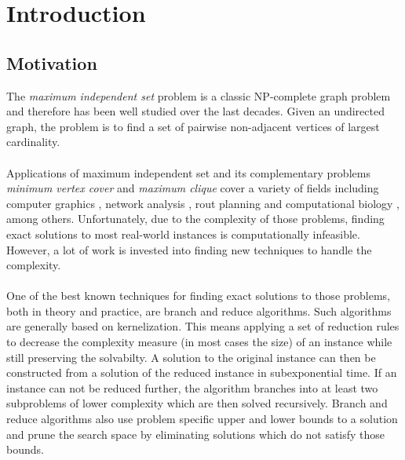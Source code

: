 \documentclass[]{article}
\title{}
\author{}
\begin{document}



\section{Introduction} \label{sec1}
\subsection{Motivation}
The \emph{maximum independent set} problem is a classic NP-complete graph problem \cite{GareyJohnson} and therefore has been well studied over the last decades. Given an undirected graph, the problem is to find a set of pairwise non-adjacent vertices of largest cardinality.\paragraph{}
Applications of maximum independent set and its complementary problems \emph{minimum vertex cover} and \emph{maximum clique} cover a variety of fields including computer graphics \cite{CG}, network analysis \cite{NW}, rout planning \cite{RP} and computational biology \cite{BIO1, BIO2}, among others. Unfortunately, due to the complexity of those problems, finding exact solutions to most real-world instances is computationally infeasible. However, a lot of work is invested into finding new techniques to handle the complexity. \paragraph{}
One of the best known techniques for finding exact solutions to those problems, both  in theory and practice, are branch and reduce algorithms. Such algorithms are generally based on kernelization. This means applying a set of reduction rules to decrease the complexity measure (in most cases the size) of an instance while still preserving the solvabilty. A solution to the original instance can then be constructed from a solution of the reduced instance in subexponential time. If an instance can not be reduced further, the algorithm branches into at least two subproblems of lower complexity which are then solved recursively. Branch and reduce algorithms also use problem specific upper and lower bounds to a solution and prune the search space by eliminating solutions which do not satisfy those bounds. \paragraph{}
\end{document}
